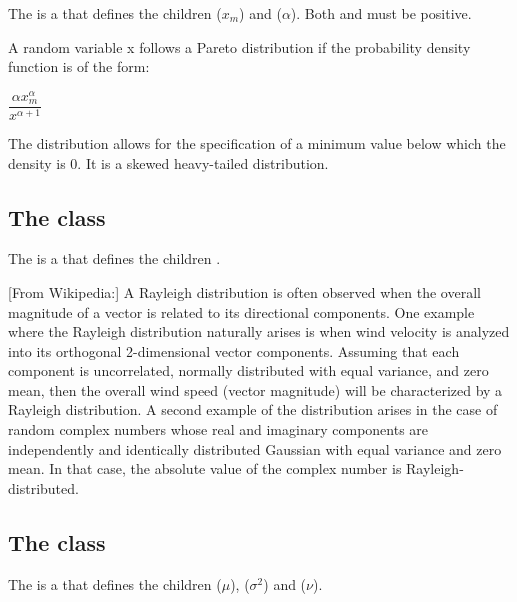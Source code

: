 The \ParetoDistribution is a \ContinuousUnivariateDistribution that defines the \UncertValue children  ($x_m$) and  ($\alpha$).  Both  and  must be positive.

A random variable x follows a Pareto distribution if the probability density function is of the form:

\begin{center}
$\dfrac{\alpha x_m^\alpha}{x^{\alpha+1}}$
\end{center}

The distribution allows for the specification of a minimum value below which the density is 0. It is a skewed heavy-tailed distribution.

\subsection{The  class}
\label{RayleighDistribution-class}
\label{rayleighdistribution-class}

The \RayleighDistribution is a \ContinuousUnivariateDistribution that defines the \UncertValue children .

[From Wikipedia:] A Rayleigh distribution is often observed when the overall magnitude of a vector is related to its directional components. One example where the Rayleigh distribution naturally arises is when wind velocity is analyzed into its orthogonal 2-dimensional vector components. Assuming that each component is uncorrelated, normally distributed with equal variance, and zero mean, then the overall wind speed (vector magnitude) will be characterized by a Rayleigh distribution. A second example of the distribution arises in the case of random complex numbers whose real and imaginary components are independently and identically distributed Gaussian with equal variance and zero mean. In that case, the absolute value of the complex number is Rayleigh-distributed.

\subsection{The  class}
\label{StudentTDistribution-class}
\label{studenttdistribution-class}

The \StudentTDistribution is a \ContinuousUnivariateDistribution that defines the \UncertValue children   ($\mu$),  ($\sigma^2$) and  ($\nu$).


